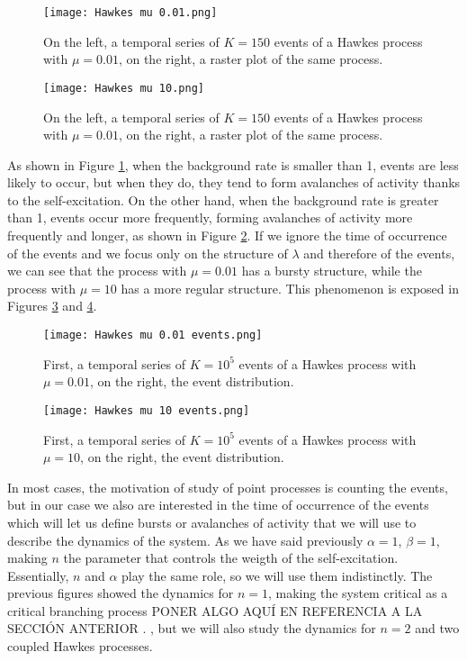 \begin{figure}[H]
    \centering
    \texttt{[image: Hawkes mu 0.01.png]}
    \caption{On the left, a temporal series of $K=150$ events of a Hawkes process with $\mu=0.01$, on the right, a raster plot of the same process.}
    \label{f: Hawkes rate}
\end{figure}

\begin{figure}[H]
    \centering
    \texttt{[image: Hawkes mu 10.png]}
    \caption{On the left, a temporal series of $K=150$ events of a Hawkes process with $\mu=0.01$, on the right, a raster plot of the same process.}
    \label{f: Hawkes rate 2}
\end{figure}

As shown in Figure \ref{f: Hawkes rate}, when the background rate is smaller than 1, events are less likely to occur, but when they do, they tend to form avalanches of activity thanks 
to the self-excitation. On the other hand, when the background rate is greater than 1, events occur more frequently, forming avalanches of activity more frequently and longer, as
shown in Figure \ref{f: Hawkes rate 2}. If we ignore the time of occurrence of the events and we focus only on the structure of $\lambda$ and therefore of the events, we can see that
the process with $\mu=0.01$ has a bursty structure, while the process with $\mu=10$ has a more regular structure. This phenomenon is exposed in Figures \ref{f: Hawkes rate burst} and
\ref{f: Hawkes rate burst 2}.

\begin{figure}[H]
    \centering
    \texttt{[image: Hawkes mu 0.01 events.png]}
    \caption{First, a temporal series of $K=10^5$ events of a Hawkes process with $\mu=0.01$, on the right, the event distribution.}
    \label{f: Hawkes rate burst}    
\end{figure}

\begin{figure}[H]
    \centering
    \texttt{[image: Hawkes mu 10 events.png]}
    \caption{First, a temporal series of $K=10^5$ events of a Hawkes process with $\mu=10$, on the right, the event distribution.}
    \label{f: Hawkes rate burst 2}    
\end{figure}

In most cases, the motivation of study of point processes is counting the events, but in our case we also are interested in the time of occurrence of the events
which will let us define bursts or avalanches of activity that we will use to describe the dynamics of the system. 
As we have said previously $\alpha = 1$, $\beta = 1$, making $n$ the parameter that controls the weigth of the self-excitation. Essentially, $n$ and $\alpha$ play the same role,
so we will use them indistinctly. The previous figures showed the dynamics for $n=1$, making the system critical as a critical branching process PONER ALGO AQUÍ EN REFERENCIA A LA SECCIÓN 
ANTERIOR \cite{notarmuzi2021percolation}.
, but we will also study the dynamics for $n=2$ and two coupled Hawkes processes.

